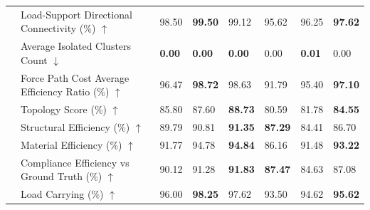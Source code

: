 \begin{table}[!h]
{\begin{tabular}{lllll|lll}
 & Load-Support Directional Connectivity (\%) $\uparrow$ & 98.50 & \textbf{99.50} & 99.12 & 95.62 & 96.25 & \textbf{97.62} \\
 & Average Isolated Clusters Count $\downarrow$ & \textbf{0.00} & \textbf{0.00} & \textbf{0.00} & 0.00 & \textbf{0.01} & 0.00 \\
 & Force Path Cost Average Efficiency Ratio (\%) $\uparrow$ & 96.47 & \textbf{98.72} & 98.63 & 91.79 & 95.40 & \textbf{97.10} \\
 & Topology Score (\%) $\uparrow$ & 85.80 & 87.60 & \textbf{88.73} & 80.59 & 81.78 & \textbf{84.55} \\
 & Structural Efficiency (\%) $\uparrow$ & 89.79 & 90.81 & \textbf{91.35} & \textbf{87.29} & 84.41 & 86.70 \\
 & Material Efficiency (\%) $\uparrow$ & 91.77 & 94.78 & \textbf{94.84} & 86.16 & 91.48 & \textbf{93.22} \\
 & Compliance Efficiency vs Ground Truth (\%) $\uparrow$ & 90.12 & 91.28 & \textbf{91.83} & \textbf{87.47} & 84.63 & 87.08 \\
 & Load Carrying (\%) $\uparrow$ & 96.00 & \textbf{98.25} & 97.62 & 93.50 & 94.62 & \textbf{95.62} \\
    \bottomrule
  \end{tabular}
  }
\end{table}